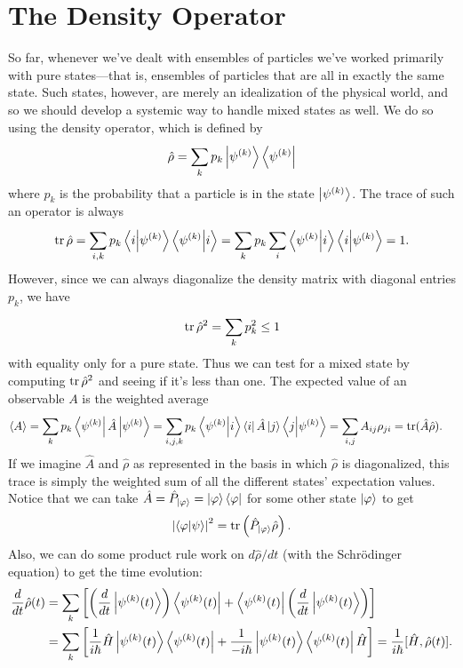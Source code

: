 \documentclass[../p116main.tex]{subfiles}
\begin{document}
\section{The Density Operator}
So far, whenever we've dealt with ensembles of particles we've worked primarily with pure states---that is, ensembles of particles that are all in exactly the same state.
Such states, however, are merely an idealization of the physical world, and so we should develop a systemic way to handle mixed states as well.
We do so using the density operator, which is defined by
\[ \hat \rho = \sum_{k}^{} p_k \left| \psi^{(k)} \right> \left< \psi^{(k)} \right| \]
where $p_k$ is the probability that a particle is in the state $\left| \psi^{(k)} \right>$.
The trace of such an operator is always
\[ \operatorname{tr} \hat \rho = \sum_{i,k}^{} p_k \left< i \middle| \psi^{(k)} \right> \left< \psi^{(k)} \middle| i \right> = \sum_{k}^{} p_k \sum_{i}^{} \left< \psi^{(k)} \middle| i \right> \left< i \middle| \psi^{(k)} \right> = 1. \]
However, since we can always diagonalize the density matrix with diagonal entries $p_k$, we have
\[ \operatorname{tr} \hat \rho^2 = \sum_{k}^{} p_k^2 \leq 1 \]
with equality only for a pure state.
Thus we can test for a mixed state by computing $\operatorname{tr} \hat \rho^2$ and seeing if it's less than one.
The expected value of an observable $A$ is the weighted average
\begin{align*}
    \left< A \right> &= \sum_{k}^{} p_k \left< \psi^{(k)} \right| \hat A \left| \psi^{(k)} \right> = \sum_{i,j,k}^{} p_k \left< \psi^{(k)} \middle| i \right> \left< i \right| \hat A \left| j \right> \left< j \middle| \psi^{(k)} \right> = \sum_{i,j}^{} A_{ij} \rho_{ji} = \operatorname{tr} (\hat A \hat \rho).
\end{align*}
If we imagine $\hat A$ and $\hat \rho$ as represented in the basis in which $\hat \rho$ is diagonalized, this trace is simply the weighted sum of all the different states' expectation values.
Notice that we can take $\hat A = \hat P_{\left| \varphi \right>} = \left| \varphi \right> \left< \varphi \right|$ for some other state $\left| \varphi \right>$ to get
\[ \left| \left< \varphi \middle| \psi \right> \right|^2 = \operatorname{tr} \left( \hat P_{\left| \varphi \right>} \hat \rho \right). \]
Also, we can do some product rule work on $d \hat \rho / dt$ (with the Schrödinger equation) to get the time evolution:
\begin{align*}
    \frac{d}{dt} \hat \rho(t) &= \sum_{k}^{} \left[ \left( \frac{d}{dt} \left| \psi^{(k)}(t) \right> \right) \left< \psi^{(k)}(t) \right| + \left< \psi^{(k)}(t) \right| \left( \frac{d}{dt} \left| \psi^{(k)}(t) \right> \right) \right] \\
    &= \sum_{k}^{} \left[ \frac{1}{i\hbar} \hat H \left| \psi^{(k)}(t) \right> \left< \psi^{(k)}(t) \right| + \frac{1}{-i\hbar} \left| \psi^{(k)}(t) \right> \left< \psi^{(k)}(t) \right| \hat H \right] = \frac{1}{i\hbar} [\hat H, \hat \rho(t)].
\end{align*}
\end{document}
